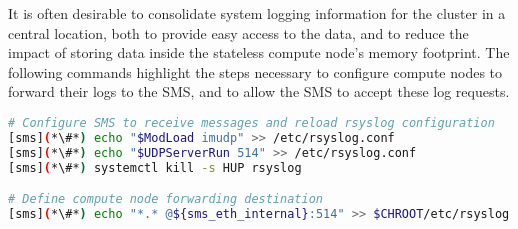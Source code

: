 It is often desirable to consolidate system logging information for the cluster in a
central location, both to provide easy access to the data, and to reduce the
impact of storing data inside the stateless compute node's memory footprint. The
following commands highlight the steps necessary to configure compute nodes to
forward their logs to the SMS, and to allow the SMS to accept these log requests.


\begin{lstlisting}[language=bash,keywords={}]
# Configure SMS to receive messages and reload rsyslog configuration
[sms](*\#*) echo "$ModLoad imudp" >> /etc/rsyslog.conf
[sms](*\#*) echo "$UDPServerRun 514" >> /etc/rsyslog.conf
[sms](*\#*) systemctl kill -s HUP rsyslog

# Define compute node forwarding destination
[sms](*\#*) echo "*.* @${sms_eth_internal}:514" >> $CHROOT/etc/rsyslog.conf
\end{lstlisting}
